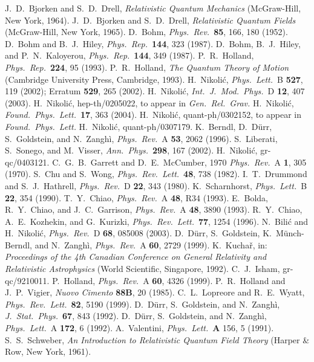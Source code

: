 \documentclass[11pt]{article}
\begin{document}
\begin{thebibliography}{99}

J.~D.~Bjorken and S.~D.~Drell, {\it Relativistic Quantum Mechanics}
(McGraw-Hill, New York, 1964).
J.~D.~Bjorken and S.~D.~Drell, {\it Relativistic Quantum Fields}
(McGraw-Hill, New York, 1965).
D.~Bohm, {\it Phys.~Rev.}~{\bf 85}, 166, 180 (1952).
D.~Bohm and B.~J.~Hiley, 
{\it Phys.~Rep.}~{\bf 144}, 323 (1987).
D.~Bohm, B.~J.~Hiley, and P.~N.~Kaloyerou, 
{\it Phys.~Rep.}~{\bf 144}, 349 (1987).
P.~R.~Holland, {\it Phys.~Rep.}~{\bf 224}, 95 (1993).
P.~R.~Holland, {\it The Quantum Theory of Motion}
(Cambridge University Press, Cambridge, 1993).
H.~Nikoli\'c, {\it Phys.~Lett.}~B {\bf 527}, 119 (2002);
Erratum {\bf 529}, 265 (2002).
H.~Nikoli\'c, {\it Int.~J.~Mod.~Phys.}~D {\bf 12}, 407 (2003).
H.~Nikoli\'c, hep-th/0205022, to appear in 
{\it Gen.~Rel.~Grav.}
H.~Nikoli\'c, {\it Found.~Phys.~Lett.}~{\bf 17}, 363 (2004).
H.~Nikoli\'c, quant-ph/0302152, 
to appear in {\it Found.~Phys.~Lett.}
H.~Nikoli\'c, quant-ph/0307179.
K.~Berndl, D.~D\"urr, S.~Goldstein, and N.~Zangh\`i, 
{\it Phys.~Rev.}~A {\bf 53}, 2062 (1996).
S.~Liberati, S.~Sonego, and M.~Visser, {\it Ann.~Phys.}~{\bf 298}, 
167 (2002).
H.~Nikoli\'c, gr-qc/0403121.
C.~G.~B.~Garrett and D.~E.~McCumber, 1970 {\it Phys.~Rev.}~A {\bf 1}, 
305 (1970).
S.~Chu and S.~Wong, {\it Phys.~Rev.~Lett.}~{\bf 48}, 738 (1982).
I.~T.~Drummond and S.~J.~Hathrell, {\it Phys.~Rev.}~D {\bf 22}, 
343 (1980).
K.~Scharnhorst, {\it Phys.~Lett.}~B {\bf 22}, 354 (1990).
T.~Y.~Chiao, {\it Phys.~Rev.}~A {\bf 48}, R34 (1993).
E.~Bolda, R.~Y.~Chiao, and J.~C.~Garrison, {\it Phys.~Rev.}~A {\bf 48}, 
3890 (1993).
R.~Y.~Chiao, A.~E.~Kozhekin, and G.~Kurizki,  
{\it Phys.~Rev.~Lett.}~{\bf 77}, 1254 (1996).
N.~Bili\'c and H.~Nikoli\'c, {\it Phys.~Rev.}~D {\bf 68}, 085008
(2003).
D.~D\"urr, S.~Goldstein, K.~M\"unch-Berndl, and N.~Zangh\`i, 
{\it Phys.~Rev.}~A {\bf 60}, 2729 (1999).
K.~Kucha\v r, in: {\it Proceedings of the 4th Canadian Conference 
on General Relativity and Relativistic Astrophysics} 
(World Scientific, Singapore, 1992).
C.~J.~Isham, gr-qc/9210011.
P.~Holland, {\it Phys.~Rev.}~A {\bf 60}, 4326 (1999).
P.~R.~Holland and J.~P.~Vigier, {\it Nuovo Cimento} {\bf 88B}, 
20 (1985).
C.~L.~Lopreore and R.~E.~Wyatt, {\it Phys.~Rev.~Lett.}~{\bf 82}, 
5190 (1999).
D.~D\"urr, S.~Goldstein, and N.~Zangh\`i,
{\it J.~Stat.~Phys.}~{\bf 67}, 843 (1992).
D.~D\"urr, S.~Goldstein, and N.~Zangh\`i, 
{\it Phys.~Lett.}~A {\bf 172}, 6 (1992).
A.~Valentini, {\it Phys.~Lett.}~{\bf A} 156, 5 (1991).
S.~S.~Schweber, {\it An Introduction to Relativistic Quantum Field Theory}
(Harper \& Row, New York, 1961).

\end{thebibliography}
\end{document}

